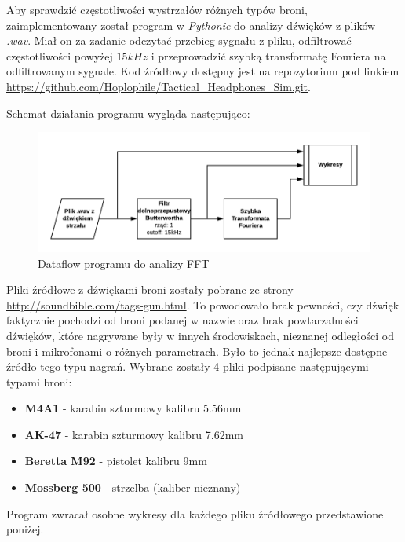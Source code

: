 Aby sprawdzić częstotliwości wystrzałów różnych typów broni, zaimplementowany został program w \textit{Pythonie} do analizy dźwięków z plików \textit{.wav}. Miał on za zadanie odczytać przebieg sygnału z pliku, odfiltrować częstotliwości powyżej $ 15kHz $ i przeprowadzić szybką transformatę Fouriera na odfiltrowanym sygnale. Kod źródłowy dostępny jest na repozytorium pod linkiem \url{https://github.com/Hoplophile/Tactical_Headphones_Sim.git}. 

Schemat działania programu wygląda następująco:

\begin{figure}[H]
	\centering
	\includegraphics[scale=1]{grafy/Python_analiza_FFT.pdf}
	\caption{\label{graf:analizaFFT} Dataflow programu do analizy FFT}
\end{figure}

Pliki źródłowe z dźwiękami broni zostały pobrane ze strony \url{http://soundbible.com/tags-gun.html}. To powodowało brak pewności, czy dźwięk faktycznie pochodzi od broni podanej w nazwie oraz brak powtarzalności dźwięków, które nagrywane były w innych środowiskach, nieznanej odległości od broni i mikrofonami o różnych parametrach. Było to jednak najlepsze dostępne źródło tego typu nagrań. Wybrane zostały 4 pliki podpisane następującymi typami broni:

\begin{itemize}
	\item \textbf{M4A1} - karabin szturmowy kalibru 5.56mm
	\item \textbf{AK-47} - karabin szturmowy kalibru 7.62mm
	\item \textbf{Beretta M92} - pistolet kalibru 9mm
	\item \textbf{Mossberg 500} - strzelba (kaliber nieznany)
\end{itemize}

Program zwracał osobne wykresy dla każdego pliku źródłowego przedstawione poniżej.

